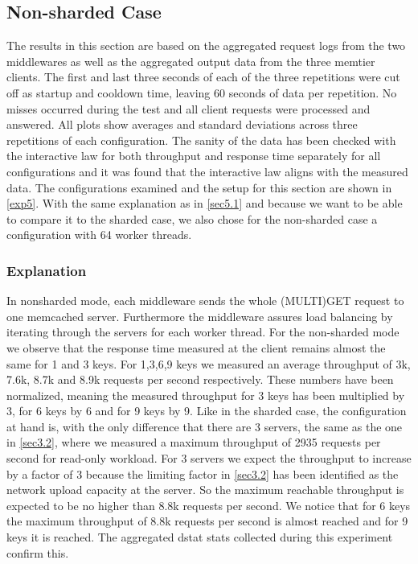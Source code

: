 \documentclass[11pt,a4paper]{article}
\begin{document}
\subsection{Non-sharded Case} \label{sec5.2}
The results in this section are based on the aggregated request logs from the two middlewares as well as the aggregated output data from the three memtier clients. The first and last three seconds of each of the three repetitions were cut off as startup and cooldown time, leaving 60 seconds of data per repetition. No misses occurred during the test and all client requests were processed and answered. All plots show averages and standard deviations across three repetitions of each configuration. The sanity of the data has been checked with the interactive law for both throughput and response time separately for all configurations and it was found that the interactive law aligns with the measured data. The configurations examined and the setup for this section are shown in \autoref{exp5}.
With the same explanation as in \autoref{sec5.1} and because we want to be able to compare it to the sharded case, we also chose for the non-sharded case a configuration with 64 worker threads.


\subsubsection{Explanation}

In nonsharded mode, each middleware sends the whole (MULTI)GET request to one memcached server. Furthermore the middleware assures load balancing by iterating through the servers for each worker thread.
For the non-sharded mode we observe that the response time measured at the client remains almost the same for 1 and 3 keys. For 1,3,6,9 keys we measured an average throughput of 3k, 7.6k, 8.7k and 8.9k requests per second respectively. These numbers have been normalized, meaning the measured throughput for 3 keys has been multiplied by 3, for 6 keys by 6 and for 9 keys by 9.
Like in the sharded case, the configuration at hand is, with the only difference that there are 3 servers, the same as the one in \autoref{sec3.2}, where we measured a maximum throughput of 2935 requests per second for read-only workload. For 3 servers we expect the throughput to increase by a factor of 3 because the limiting factor in \autoref{sec3.2} has been identified as the network upload capacity at the server. So the maximum reachable throughput is expected to be no higher than 8.8k requests per second.
We notice that for 6 keys the maximum throughput of 8.8k requests per second is almost reached and for 9 keys it is reached. The aggregated dstat stats collected during this experiment confirm this.
\end{document}
